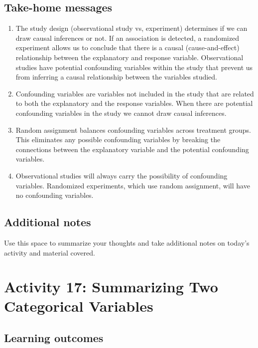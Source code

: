 \documentclass[
]{report}
\begin{document}
\subsection{Take-home messages}\label{take-home-messages-15}

\begin{enumerate}
\def\labelenumi{\arabic{enumi}.}
\item
  The study design (observational study vs, experiment) determines if we can draw causal inferences or not. If an association is detected, a randomized experiment allows us to conclude that there is a causal (cause-and-effect) relationship between the explanatory and response variable. Observational studies have potential confounding variables within the study that prevent us from inferring a causal relationship between the variables studied.
\item
  Confounding variables are variables not included in the study that are related to both the explanatory and the response variables. When there are potential confounding variables in the study we cannot draw causal inferences.
\item
  Random assignment balances confounding variables across treatment groups. This eliminates any possible confounding variables by breaking the connections between the explanatory variable and the potential confounding variables.
\item
  Observational studies will always carry the possibility of confounding variables. Randomized experiments, which use random assignment, will have no confounding variables.
\end{enumerate}

\subsection{Additional notes}\label{additional-notes-15}

Use this space to summarize your thoughts and take additional notes on today's activity and material covered.

\newpage

\section{Activity 17: Summarizing Two Categorical Variables}\label{activity-17-summarizing-two-categorical-variables}


\subsection{Learning outcomes}\label{learning-outcomes-18}
\end{document}
